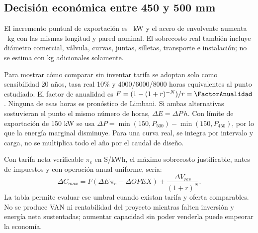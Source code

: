 \subsection{Decisión económica entre 450 y 500 mm}
El incremento puntual de exportación es \GananciaDiametro\ kW y el acero de envolvente aumenta \DeltaMasa\ kg con las mismas longitud y pared nominal. El sobrecosto real también incluye diámetro comercial, válvula, curvas, juntas, silletas, transporte e instalación; no se estima con kg adicionales solamente.

Para mostrar cómo comparar sin inventar tarifa se adoptan solo como sensibilidad 20 años, tasa real 10\% y 4000/6000/8000 horas equivalentes al punto estudiado. El factor de anualidad es $F=(1-(1+r)^{-N})/r=\FactorAnualidad$. Ninguna de esas horas es pronóstico de Limbani.
\small\normalsize
Si ambas alternativas sostuvieran el punto el mismo número de horas, $\Delta E=\Delta P\,h$. Con límite de exportación de 150 kW se usa $\Delta P=\min(150,P_{500})-\min(150,P_{450})$, por lo que la energía marginal disminuye. Para una curva real, se integra por intervalo y carga, no se multiplica todo el año por el caudal de diseño.

Con tarifa neta verificable $\pi_e$ en S/kWh, el máximo sobrecosto justificable, antes de impuestos y con operación anual uniforme, sería:
\[
\Delta C_{max}=F(\Delta E\,\pi_e-\Delta OPEX)+\frac{\Delta V_{res}}{(1+r)^N}.
\]
La tabla permite evaluar ese umbral cuando existan tarifa y oferta comparables. No se produce VAN ni rentabilidad del proyecto mientras falten inversión y energía neta sustentadas; aumentar capacidad sin poder venderla puede empeorar la economía.

